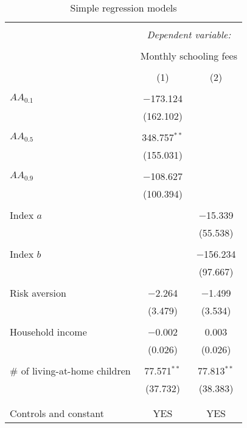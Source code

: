 
\begin{table}[!t] \centering 
  \caption{Simple regression models} 
  \label{tab:2} 
  \begin{threeparttable}
\begin{tabular}{@{\extracolsep{5pt}}lcc} 
\\[-1.8ex]\hline 
\hline \\[-1.8ex] 
 & \multicolumn{2}{c}{\textit{Dependent variable:}} \\ 
\cline{2-3} 
\\[-1.8ex] & \multicolumn{2}{c}{Monthly schooling fees} \\ 
\\[-1.8ex] & (1) & (2)\\ 
\hline \\[-1.8ex] 
 $AA_{0.1}$ & $-$173.124 &  \\ 
  & (162.102) &  \\ 
  & & \\ 
 $AA_{0.5}$ & 348.757$^{**}$ &  \\ 
  & (155.031) &  \\ 
  & & \\ 
 $AA_{0.9}$ & $-$108.627 &  \\ 
  & (100.394) &  \\ 
  & & \\ 
 Index $a$ &  & $-$15.339 \\ 
  &  & (55.538) \\ 
  & & \\ 
 Index $b$ &  & $-$156.234 \\ 
  &  & (97.667) \\ 
  & & \\ 
 Risk aversion & $-$2.264 & $-$1.499 \\ 
  & (3.479) & (3.534) \\ 
  & & \\ 
 Household income & $-$0.002 & 0.003 \\ 
  & (0.026) & (0.026) \\ 
  & & \\ 
 \# of living-at-home children & 77.571$^{**}$ & 77.813$^{**}$ \\ 
  & (37.732) & (38.383) \\ 
  & & \\ 
\hline \\[-1.8ex] 
Controls and constant & YES & YES \\ 

\end{tabular}
\end{threeparttable}
\end{table}
